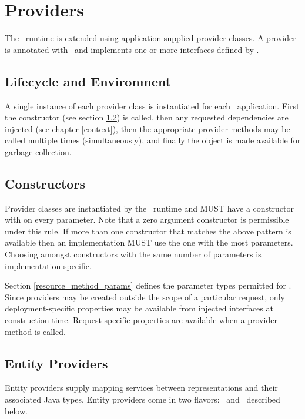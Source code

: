 \chapter{Providers}
\label{providers}

The \jaxrs\ runtime is extended using application-supplied provider classes. A provider is annotated with \Provider\ and implements one or more interfaces defined by \jaxrs.

\section{Lifecycle and Environment}

A single instance of each provider class is instantiated for each \jaxrs\ application. First the constructor (see section \ref{provider_class_constructor}) is called, then any requested dependencies are injected (see chapter \ref{context}), then the appropriate provider methods may be called multiple times (simultaneously), and finally the object is made available for garbage collection.

\section{Constructors}
\label{provider_class_constructor}

Provider classes are instantiated by the \jaxrs\ runtime and MUST have a constructor with \Context on every parameter. Note that a zero argument constructor is permissible under this rule. If more than one constructor that matches the above pattern is available then an implementation MUST use the one with the most parameters. Choosing amongst constructors with the same number of parameters is implementation specific.

Section \ref{resource_method_params} defines the parameter types permitted for \Context. Since providers may be created outside the scope of a particular request, only deployment-specific properties may be available from injected interfaces at construction time. Request-specific properties are available when a provider method is called.

\section{Entity Providers}
\label{entity_providers}

Entity providers supply mapping services between representations and their associated Java types. Entity providers come in two flavors: \MsgRead\ and \MsgWrite\ described below.

